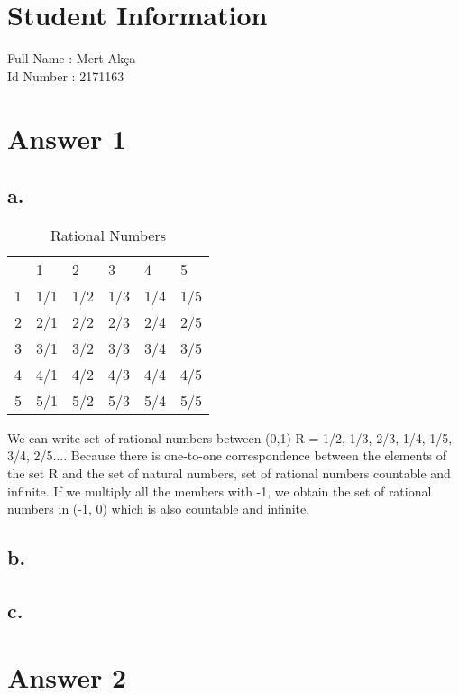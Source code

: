 \documentclass[12pt]{article}
\begin{document}
\section*{Student Information } 
Full Name : Mert Akça  \\
Id Number : 2171163 \\

\section*{Answer 1}

\subsection*{a.}


\begin{table}[h]
\centering
\caption{Rational Numbers}
\label{my-label}
\begin{tabular}{llllll}
  & 1   & 2   & 3   & 4   & 5   \\
1 & 1/1 & 1/2 & 1/3 & 1/4 & 1/5 \\
2 & 2/1 & 2/2 & 2/3 & 2/4 & 2/5 \\
3 & 3/1 & 3/2 & 3/3 & 3/4 & 3/5 \\
4 & 4/1 & 4/2 & 4/3 & 4/4 & 4/5 \\
5 & 5/1 & 5/2 & 5/3 & 5/4 & 5/5
\end{tabular}
\end{table}

We can write set of rational numbers between (0,1) R = {1/2, 1/3, 2/3, 1/4, 1/5, 3/4, 2/5...}. Because there is one-to-one correspondence between the elements of the set R and the set of natural numbers, set of rational numbers countable and infinite. If we multiply all the members with -1, we obtain the set of rational numbers in (-1, 0) which is also countable and infinite.

\subsection*{b.}

\subsection*{c.}

\section*{Answer 2}
\end{document}
